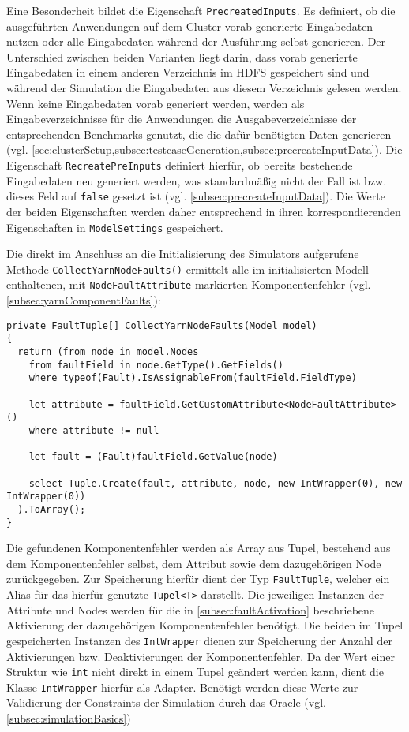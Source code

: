 Eine Besonderheit bildet die Eigenschaft \texttt{PrecreatedInputs}.
Es definiert, ob die ausgeführten Anwendungen auf dem Cluster vorab generierte Eingabedaten nutzen oder alle Eingabedaten während der Ausführung selbst generieren.
Der Unterschied zwischen beiden Varianten liegt darin, dass vorab generierte Eingabedaten in einem anderen Verzeichnis im HDFS gespeichert sind und während der Simulation die Eingabedaten aus diesem Verzeichnis gelesen werden.
Wenn keine Eingabedaten vorab generiert werden, werden als Eingabeverzeichnisse für die Anwendungen die Ausgabeverzeichnisse der entsprechenden Benchmarks genutzt, die die dafür benötigten Daten generieren (vgl. \cref{sec:clusterSetup,subsec:testcaseGeneration,subsec:precreateInputData}).
Die Eigenschaft \texttt{RecreatePreInputs} definiert hierfür, ob bereits bestehende Eingabedaten neu generiert werden, was standardmäßig nicht der Fall ist bzw. dieses Feld auf \texttt{false} gesetzt ist (vgl. \cref{subsec:precreateInputData}).
Die Werte der beiden Eigenschaften werden daher entsprechend in ihren korrespondierenden Eigenschaften in \texttt{ModelSettings} gespeichert.

Die direkt im Anschluss an die Initialisierung des Simulators aufgerufene Methode \texttt{CollectYarnNodeFaults()} ermittelt alle im initialisierten Modell enthaltenen, mit \texttt{NodeFaultAttribute} markierten Komponentenfehler (vgl. \cref{subsec:yarnComponentFaults}):

\begin{lstlisting}[label=lst:hadoopSimulationCollectFaults,style=cs,
caption={[Ermitteln der Komponentenfehler mit dem NodeFaultAttribute]
    Ermitteln der Komponentenfehler mit dem \texttt{NodeFaultAttribute}}]
private FaultTuple[] CollectYarnNodeFaults(Model model)
{
  return (from node in model.Nodes      
    from faultField in node.GetType().GetFields()
    where typeof(Fault).IsAssignableFrom(faultField.FieldType)
    
    let attribute = faultField.GetCustomAttribute<NodeFaultAttribute>()
    where attribute != null
    
    let fault = (Fault)faultField.GetValue(node)
    
    select Tuple.Create(fault, attribute, node, new IntWrapper(0), new IntWrapper(0))
  ).ToArray();
}
\end{lstlisting}

Die gefundenen Komponentenfehler werden als Array aus Tupel, bestehend aus dem Komponentenfehler selbst, dem Attribut sowie dem dazugehörigen Node zurückgegeben.
Zur Speicherung hierfür dient der Typ \texttt{FaultTuple}, welcher ein Alias für das hierfür genutzte \texttt{Tupel<T>} darstellt.
Die jeweiligen Instanzen der Attribute und Nodes werden für die in \cref{subsec:faultActivation} beschriebene Aktivierung der dazugehörigen Komponentenfehler benötigt.
Die beiden im Tupel gespeicherten Instanzen des \texttt{IntWrapper} dienen zur Speicherung der Anzahl der Aktivierungen bzw. Deaktivierungen der Komponentenfehler.
Da der Wert einer Struktur wie \texttt{int} nicht direkt in einem Tupel geändert werden kann, dient die Klasse \texttt{IntWrapper} hierfür als Adapter.
Benötigt werden diese Werte zur Validierung der Constraints der Simulation durch das Oracle (vgl. \cref{subsec:simulationBasics})

